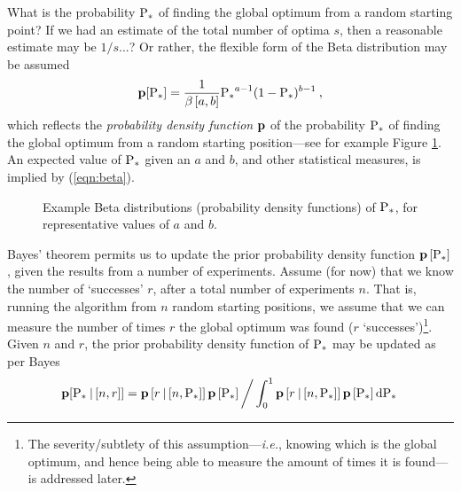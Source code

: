 \documentclass[11pt]{article}
\newcommand*\GnuplotDefs{
        set samples 501;
        Binv(p,q)=exp(lgamma(p+q)-lgamma(p)-lgamma(q));
        beta(x,p,q)=p<=0||q<=0?1/0:x<0||x>1?0.0:Binv(p,q)*x**(p-1.0)*(1.0-x)**(q-1.0);
    }
\begin{document}
What is the probability $\P_\ast$ of finding the global optimum from a random starting point? If we had an estimate of the total number of optima $s$, then a reasonable estimate may be $1/s$...? Or rather, the flexible form of the Beta distribution may be assumed
\begin{equation}
\label{eqn:beta}
\p[\P_\ast] = \frac{1}{\beta\left[a,b\right]} {\P_\ast}^{a-1}(1 - \P_\ast)^{b-1} \: ,
\end{equation}
which reflects the \emph{probability density function} $\p$ of the probability $\P_\ast$ of finding the global optimum from a random starting position---see for example Figure \ref{fig:beta}. An expected value of $\P_\ast$ given an $a$ and $b$, and other statistical measures, is implied by (\ref{eqn:beta}).
\begin{figure}
\centering
{}
\caption{\label{fig:beta}Example Beta distributions (probability density functions) of ${\P_\ast}$, for representative values of $a$ and $b$.}
\end{figure}

Bayes' theorem permits us to update the prior probability density function $\p\left[\P_\ast\right]$, given the results from a number of experiments. Assume (for now) that we know the number of `successes' $r$, after a total number of experiments $n$. That is, running the algorithm from $n$ random starting positions, we assume that we can measure the number of times $r$ the global optimum was found ($r$ `successes')\footnote{The severity/subtlety of this assumption---\emph{i.e.}, knowing which is the global optimum, and hence being able to measure the amount of times it is found---is addressed later.}. Given $n$ and $r$, the prior probability density function of $\P_\ast$ may be updated as per Bayes 
\begin{equation}
\label{eqn:bay}
\p[\P_\ast \: | \left[ n, r \right]] = \p\left[ r \: | \left[ n, \P_\ast \right]  \right] \p\left[ \P_\ast \right] \bigg/ \int_0^1 \p\left[ r \: | \left[ n, \P_\ast \right]  \right] \p\left[ \P_\ast \right] \textrm{d}\P_\ast \:
\end{equation}
\end{document}
